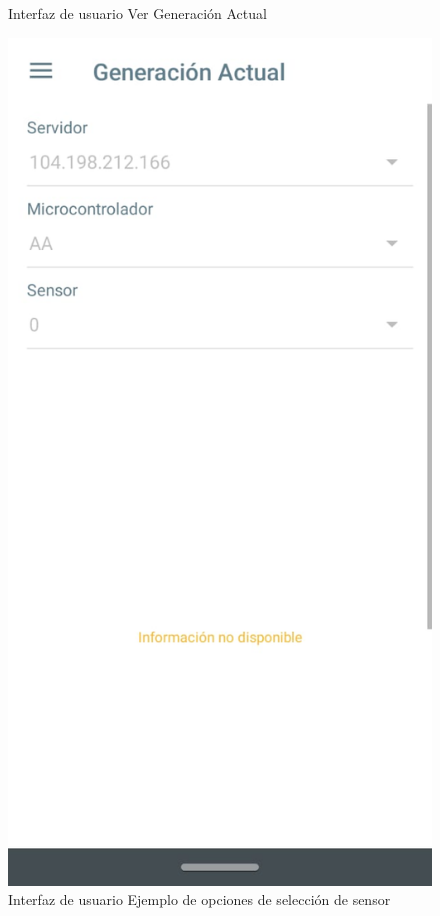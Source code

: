 \begin{figure}[H]
	\caption{Interfaz de usuario Ver Generación Actual}
	\label{fig:monitoreoReal}
\end{figure}

\begin{figure}[H]
	\centering
	\includegraphics[scale=0.4]{Capitulo4/software/submodulos/images/man1.png}
	\caption{Interfaz de usuario Ejemplo de opciones de selección de sensor}
	\label{fig:monitoreo}
\end{figure}

